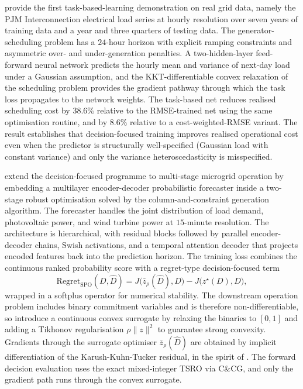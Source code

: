\citet{DontiAmosKolter2017} provide the first task-based-learning demonstration
on real grid data, namely the PJM Interconnection electrical load series at
hourly resolution over seven years of training data and a year and three quarters
of testing data. The generator-scheduling problem has a $24$-hour horizon
with explicit ramping constraints and asymmetric over- and under-generation
penalties. A two-hidden-layer feed-forward neural network predicts the
hourly mean and variance of next-day load under a Gaussian assumption, and the
KKT-differentiable convex relaxation of the scheduling problem provides the
gradient pathway through which the task loss propagates to the network
weights. The task-based net reduces realised scheduling cost by $38.6\%$
relative to the RMSE-trained net using the same optimisation routine, and by
$8.6\%$ relative to a cost-weighted-RMSE variant. The result establishes that
decision-focused training improves realised operational cost even when the
predictor is structurally well-specified (Gaussian load with constant
variance) and only the variance heteroscedasticity is misspecified.

\citet{CaoXu2025} extend the decision-focused programme to multi-stage
microgrid operation by embedding a multilayer encoder-decoder probabilistic
forecaster inside a two-stage robust optimisation solved by the
column-and-constraint generation algorithm. The forecaster handles the
joint distribution of load demand, photovoltaic power, and wind turbine
power at $15$-minute resolution. The architecture is hierarchical, with
residual blocks followed by parallel encoder-decoder chains, Swish
activations, and a temporal attention decoder that projects encoded features
back into the prediction horizon. The training loss combines the continuous
ranked probability score with a regret-type decision-focused term
\begin{equation}
\mathrm{Regret}_{\mathrm{SPO}}(D, \hat D)
= J\bigl(\bar z_\rho(\hat D), D\bigr) - J\bigl(z^\star(D), D\bigr),
\label{eq:caoxu_regret}
\end{equation}
wrapped in a softplus operator for numerical stability. The downstream
operation problem includes binary commitment variables and is therefore
non-differentiable, so \citet{CaoXu2025} introduce a continuous convex
surrogate by relaxing the binaries to $[0, 1]$ and adding a Tikhonov
regularisation $\rho \|z\|^2$ to guarantee strong convexity. Gradients
through the surrogate optimiser $\bar z_\rho(\hat D)$ are obtained by
implicit differentiation of the Karush-Kuhn-Tucker residual, in the spirit
of \citet{DontiAmosKolter2017}. The forward decision evaluation uses the
exact mixed-integer TSRO via C\&CG, and only the gradient path runs through
the convex surrogate.

